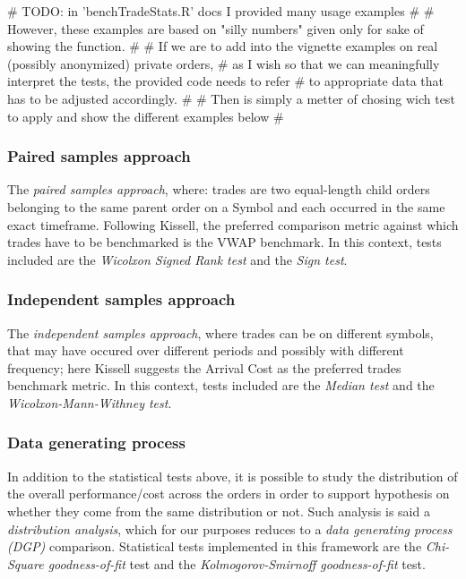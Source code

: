 \begin{Schunk}
\begin{Sinput}
# TODO: in 'benchTradeStats.R' docs I provided many usage examples 
# 
# However, these examples are based on "silly numbers" given only for sake of showing the function.
# 
# If we are to add into the vignette examples on real (possibly anonymized) private orders, 
# as I wish so that we can meaningfully interpret the tests, the provided code needs to refer 
# to appropriate data that has to be adjusted accordingly. 
# 
# Then is simply a metter of chosing wich test to apply and show the different examples below
# 
\end{Sinput}
\end{Schunk}

\hypertarget{paired-samples-approach}{%
\subsubsection{Paired samples approach}\label{paired-samples-approach}}

The \emph{paired samples approach}, where: trades are two equal-length
child orders belonging to the same parent order on a Symbol and each
occurred in the same exact timeframe. Following Kissell, the preferred
comparison metric against which trades have to be benchmarked is the
VWAP benchmark. In this context, tests included are the
\emph{Wicolxon Signed Rank test} and the \emph{Sign test}.

\hypertarget{independent-samples-approach}{%
\subsubsection{Independent samples
approach}\label{independent-samples-approach}}

The \emph{independent samples approach}, where trades can be on
different symbols, that may have occured over different periods and
possibly with different frequency; here Kissell suggests the Arrival
Cost as the preferred trades benchmark metric. In this context, tests
included are the \emph{Median test} and the
\emph{Wicolxon-Mann-Withney test}.

\hypertarget{data-generating-process}{%
\subsubsection{Data generating process}\label{data-generating-process}}

In addition to the statistical tests above, it is possible to study the
distribution of the overall performance/cost across the orders in order
to support hypothesis on whether they come from the same distribution or
not. Such analysis is said a \emph{distribution analysis}, which for our
purposes reduces to a \emph{data generating process (DGP)} comparison.
Statistical tests implemented in this framework are the
\emph{Chi-Square goodness-of-fit} test and the
\emph{Kolmogorov-Smirnoff goodness-of-fit} test.

